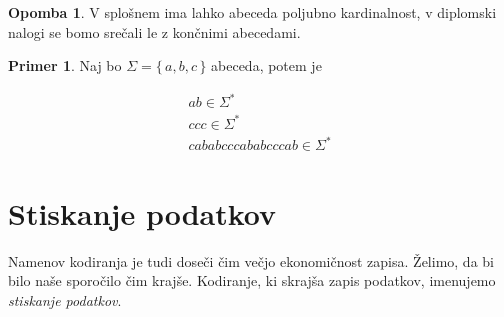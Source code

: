 \documentclass{amsart}
\theoremstyle{definition} %
\newtheorem{primer}[definicija]{Primer}
\newtheorem{opomba}[definicija]{Opomba}
\theoremstyle{plain} %
\begin{document}
\begin{opomba}
    
    V splošnem ima lahko abeceda poljubno kardinalnost, v diplomski nalogi se bomo srečali le z končnimi abecedami.

\end{opomba}

\begin{primer}
    
    Naj bo $ \Sigma = \{\, a,b,c \,\} $ abeceda, potem je

    \begin{align*} 
        ab \in \Sigma^* \\
        ccc \in \Sigma^* \\
        cababcccababcccab \in \Sigma^*
    \end{align*}

\end{primer}

\section{Stiskanje podatkov}

Namenov kodiranja je tudi doseči čim večjo ekonomičnost zapisa. Želimo, da bi bilo naše sporočilo čim
 krajše. Kodiranje, ki skrajša zapis podatkov, imenujemo \textit{stiskanje podatkov}.
\end{document}
